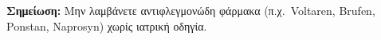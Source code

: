 \documentclass[10pt,greek]{article}
\begin{document}
\begin{MedTable}
\end{MedTable}

\textbf{Σημείωση:} Μην λαμβάνετε αντιφλεγμονώδη φάρμακα (π.χ.\ Voltaren, Brufen, Ponstan, Naprosyn) χωρίς ιατρική οδηγία.
\end{document}
